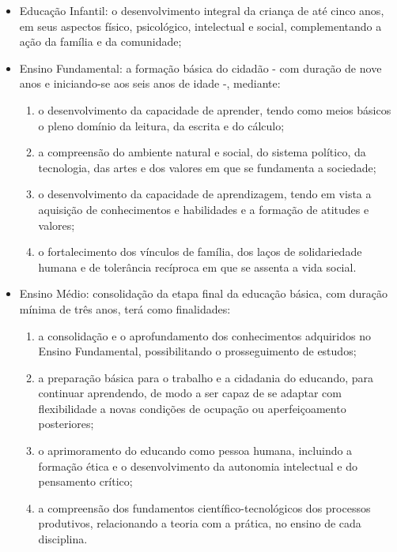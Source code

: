 \begin{itemize}
	\item Educação Infantil: o desenvolvimento integral da criança de até cinco anos, em seus aspectos físico, psicológico, intelectual e social, complementando a ação da família e da comunidade;
	\item Ensino Fundamental: a formação básica do cidadão - com duração de nove anos e iniciando-se aos seis anos de idade -, mediante:

	\begin{enumerate}
\item o desenvolvimento da capacidade de aprender, tendo como meios básicos o pleno domínio da leitura, da escrita e do cálculo;
\item a compreensão do ambiente natural e social, do sistema político, da tecnologia, das artes e dos valores em que se fundamenta a sociedade;
\item o desenvolvimento da capacidade de aprendizagem, tendo em vista a aquisição de conhecimentos e habilidades e a formação de atitudes e valores;
\item o fortalecimento dos vínculos de família, dos laços de solidariedade humana e de tolerância recíproca em que se assenta a vida social.
	\end{enumerate}

	\item Ensino Médio: consolidação da etapa final da educação básica, com duração mínima de três anos, terá como finalidades:

	\begin{enumerate}
		\item a consolidação e o aprofundamento dos conhecimentos adquiridos no Ensino Fundamental, possibilitando o prosseguimento de estudos;
\item a preparação básica para o trabalho e a cidadania do educando, para continuar aprendendo, de modo a ser capaz de se adaptar com flexibilidade a novas condições de ocupação ou aperfeiçoamento posteriores;
\item o aprimoramento do educando como pessoa humana, incluindo a formação ética e o desenvolvimento da autonomia intelectual e do pensamento crítico;
\item a compreensão dos fundamentos científico-tecnológicos dos processos produtivos, relacionando a teoria com a prática, no ensino de cada disciplina.

	\end{enumerate}
\end{itemize}

